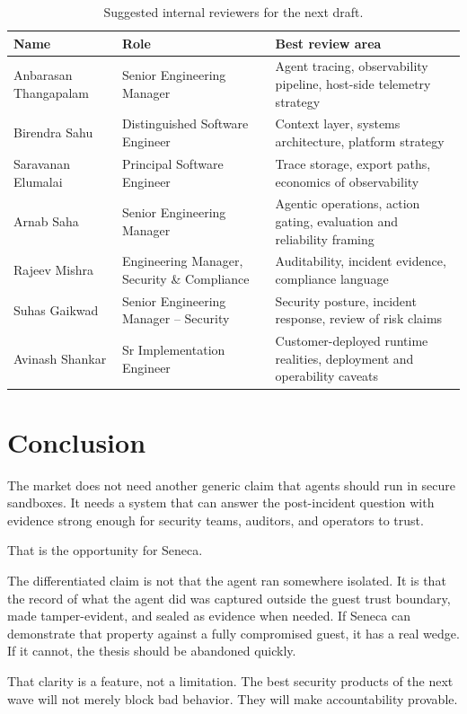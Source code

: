 \documentclass[11pt]{article}
\begin{document}
\begin{table}[h]
\centering
\begin{tabular}{p{} p{} p{}}
\toprule
\textbf{Name} & \textbf{Role} & \textbf{Best review area} \\
\midrule
Anbarasan Thangapalam & Senior Engineering Manager & Agent tracing, observability pipeline, host-side telemetry strategy \\
Birendra Sahu & Distinguished Software Engineer & Context layer, systems architecture, platform strategy \\
Saravanan Elumalai & Principal Software Engineer & Trace storage, export paths, economics of observability \\
Arnab Saha & Senior Engineering Manager & Agentic operations, action gating, evaluation and reliability framing \\
Rajeev Mishra & Engineering Manager, Security \& Compliance & Auditability, incident evidence, compliance language \\
Suhas Gaikwad & Senior Engineering Manager -- Security & Security posture, incident response, review of risk claims \\
Avinash Shankar & Sr Implementation Engineer & Customer-deployed runtime realities, deployment and operability caveats \\
\bottomrule
\end{tabular}
\caption{Suggested internal reviewers for the next draft.}
\end{table}

\section{Conclusion}

The market does not need another generic claim that agents should run in secure sandboxes. It needs a system that can answer the post-incident question with evidence strong enough for security teams, auditors, and operators to trust.

That is the opportunity for Seneca.

The differentiated claim is not that the agent ran somewhere isolated. It is that the record of what the agent did was captured outside the guest trust boundary, made tamper-evident, and sealed as evidence when needed. If Seneca can demonstrate that property against a fully compromised guest, it has a real wedge. If it cannot, the thesis should be abandoned quickly.

That clarity is a feature, not a limitation. The best security products of the next wave will not merely block bad behavior. They will make accountability provable.
\end{document}
